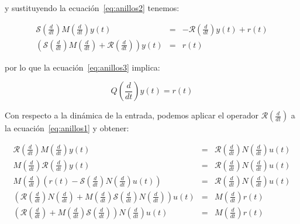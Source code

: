             y sustituyendo la ecuación~\ref{eq:anillos2} tenemos:

            \begin{eqnarray*}
                \mathcal{S} \left( \frac{d}{dt} \right) M \left( \frac{d}{dt} \right) y(t) & = & -\mathcal{R} \left( \frac{d}{dt} \right) y(t) + r(t) \\
                \left( \mathcal{S} \left( \frac{d}{dt} \right) M \left( \frac{d}{dt} \right) + \mathcal{R} \left( \frac{d}{dt} \right) \right) y(t) & = & r(t)
            \end{eqnarray*}

            por lo que la ecuación~\ref{eq:anillos3} implica:

            \begin{equation*}
                Q \left( \frac{d}{dt} \right) y(t) = r(t)
            \end{equation*}

            Con respecto a la dinámica de la entrada, podemos aplicar el operador $\mathcal{R} \left( \frac{d}{dt} \right)$ a la ecuación~\ref{eq:anillos1} y obtener:

            \begin{eqnarray*}
                \mathcal{R} \left( \frac{d}{dt} \right) M \left( \frac{d}{dt} \right) y(t) & = & \mathcal{R} \left( \frac{d}{dt} \right) N \left( \frac{d}{dt} \right) u(t) \\
                M \left( \frac{d}{dt} \right) \mathcal{R} \left( \frac{d}{dt} \right) y(t) & = & \mathcal{R} \left( \frac{d}{dt} \right) N \left( \frac{d}{dt} \right) u(t) \\
                M \left( \frac{d}{dt} \right) \left( r(t) - \mathcal{S} \left( \frac{d}{dt} \right) N \left( \frac{d}{dt} \right) u(t) \right) & = & \mathcal{R} \left( \frac{d}{dt} \right) N \left( \frac{d}{dt} \right) u(t) \\
                \left( \mathcal{R} \left( \frac{d}{dt} \right) N \left( \frac{d}{dt} \right) + M \left( \frac{d}{dt} \right) \mathcal{S} \left( \frac{d}{dt} \right) N \left( \frac{d}{dt} \right) \right) u(t) & = & M \left( \frac{d}{dt} \right) r(t) \\
                \left( \mathcal{R} \left( \frac{d}{dt} \right) + M \left( \frac{d}{dt} \right) \mathcal{S} \left( \frac{d}{dt} \right) \right) N \left( \frac{d}{dt} \right) u(t) & = & M \left( \frac{d}{dt} \right) r(t) \\
            \end{eqnarray*}

